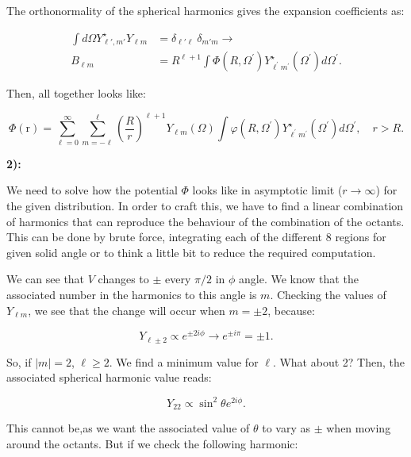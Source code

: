 The orthonormality of the spherical harmonics gives the expansion coefficients as:

\begin{equation}
	\begin{split}
		\int d\Omega Y^{\star}_{\ell',m'} Y_{\ell m} &= \delta_{\ell' \ell} \: \delta_{m' m} \rightarrow \\
		B_{\ell m}&=R^{\ell+1} \int \Phi\left(R, \Omega^{\prime}\right) Y_{\ell^{\prime} m^{\prime}}^{\star}\left(\Omega^{\prime}\right) d \Omega^{\prime}.
	\end{split}
\end{equation}

Then, all together looks like:

\begin{equation}
	\Phi(\mathrm{r})=\sum_{\ell=0}^{\infty} \sum_{m=-\ell}^{\ell}\left(\frac{R}{r}\right)^{\ell+1} Y_{\ell m}(\Omega) \int \varphi\left(R, \Omega^{\prime}\right) Y_{\ell^{\prime} m^{\prime}}^{\star}\left(\Omega^{\prime}\right) d \Omega^{\prime}, \quad r>R.
\end{equation}
	
\textbf{2):}

We need to solve how the potential $\Phi$ looks like in asymptotic limit ($r\rightarrow \infty$) for the given distribution. In order to craft this, we have to find a linear combination of harmonics that can reproduce the behaviour of the combination of the octants. This can be done by brute force, integrating each of the different 8 regions for given solid angle or to think a little bit to reduce the required computation.

We can see that $V$ changes to $\pm$ every $\pi/2$ in $\phi$ angle. We know that the associated number in the harmonics to this angle is $m$. Checking the values of $Y_{\ell m}$, we see that the change will occur when $m = \pm 2$, because:
	
\begin{equation}
	Y_{\ell \pm 2} \propto e^{\pm 2 i \phi} \rightarrow e^{\pm i \pi} = \pm 1.
\end{equation}

So, if $|m| =2$, $\ell \ge 2$. We find a minimum value for $\ell$. What about 2? Then, the associated spherical harmonic value reads:
	
\begin{equation}
	Y_{2 2} \propto \sin^{2} \theta e^{2 i \phi}.
\end{equation}

This cannot be,as we want the associated value of $\theta$ to vary as $\pm$ when moving around the octants. But if we check the following harmonic:
	
